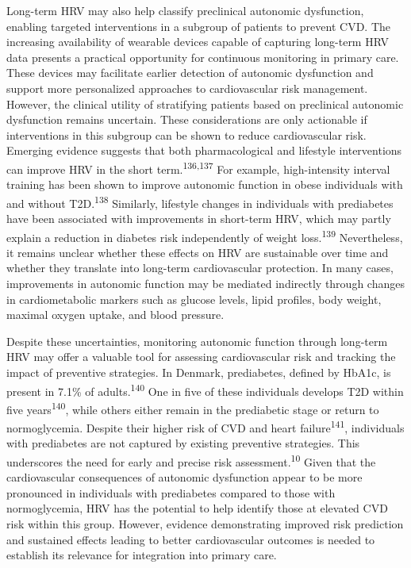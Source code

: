 \documentclass[
  letterpaper,
  headsepline=true,
  open=any]{scrbook}
\begin{document}
Long-term HRV may also help classify preclinical autonomic dysfunction,
enabling targeted interventions in a subgroup of patients to prevent
CVD. The increasing availability of wearable devices capable of
capturing long-term HRV data presents a practical opportunity for
continuous monitoring in primary care. These devices may facilitate
earlier detection of autonomic dysfunction and support more personalized
approaches to cardiovascular risk management. However, the clinical
utility of stratifying patients based on preclinical autonomic
dysfunction remains uncertain. These considerations are only actionable
if interventions in this subgroup can be shown to reduce cardiovascular
risk. Emerging evidence suggests that both pharmacological and lifestyle
interventions can improve HRV in the short
term.\textsuperscript{136,137} For example, high-intensity interval
training has been shown to improve autonomic function in obese
individuals with and without T2D.\textsuperscript{138} Similarly,
lifestyle changes in individuals with prediabetes have been associated
with improvements in short-term HRV, which may partly explain a
reduction in diabetes risk independently of weight
loss.\textsuperscript{139} Nevertheless, it remains unclear whether
these effects on HRV are sustainable over time and whether they
translate into long-term cardiovascular protection. In many cases,
improvements in autonomic function may be mediated indirectly through
changes in cardiometabolic markers such as glucose levels, lipid
profiles, body weight, maximal oxygen uptake, and blood pressure.

Despite these uncertainties, monitoring autonomic function through
long-term HRV may offer a valuable tool for assessing cardiovascular
risk and tracking the impact of preventive strategies. In Denmark,
prediabetes, defined by HbA1c, is present in 7.1\% of
adults.\textsuperscript{140} One in five of these individuals develops
T2D within five years\textsuperscript{140}, while others either remain
in the prediabetic stage or return to normoglycemia. Despite their
higher risk of CVD and heart failure\textsuperscript{141}, individuals
with prediabetes are not captured by existing preventive strategies.
This underscores the need for early and precise risk
assessment.\textsuperscript{10} Given that the cardiovascular
consequences of autonomic dysfunction appear to be more pronounced in
individuals with prediabetes compared to those with normoglycemia, HRV
has the potential to help identify those at elevated CVD risk within
this group. However, evidence demonstrating improved risk prediction and
sustained effects leading to better cardiovascular outcomes is needed to
establish its relevance for integration into primary care.
\end{document}
